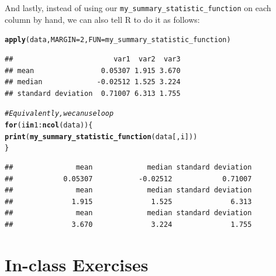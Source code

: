 \documentclass{article}\usepackage[]{graphicx}\usepackage[]{color}
\makeatletter
\newcommand{\hlnum}[1]{\textcolor[rgb]{0.686,0.059,0.569}{#1}}%
\newcommand{\hlcom}[1]{\textcolor[rgb]{0.678,0.584,0.686}{\textit{#1}}}%
\newcommand{\hlopt}[1]{\textcolor[rgb]{0,0,0}{#1}}%
\newcommand{\hlstd}[1]{\textcolor[rgb]{0.345,0.345,0.345}{#1}}%
\newcommand{\hlkwa}[1]{\textcolor[rgb]{0.161,0.373,0.58}{\textbf{#1}}}%
\newcommand{\hlkwc}[1]{\textcolor[rgb]{0.333,0.667,0.333}{#1}}%
\newcommand{\hlkwd}[1]{\textcolor[rgb]{0.737,0.353,0.396}{\textbf{#1}}}%
\newenvironment{kframe}{%
 \def\at@end@of@kframe{}%
 \ifinner\ifhmode%
  \def\at@end@of@kframe{\end{minipage}}%
  \begin{minipage}{\columnwidth}%
 \fi\fi%
 \def\FrameCommand##1{\hskip\@totalleftmargin \hskip-\fboxsep
 \colorbox{shadecolor}{##1}\hskip-\fboxsep
     \hskip-\linewidth \hskip-\@totalleftmargin \hskip\columnwidth}%
 \MakeFramed {\advance\hsize-\width
   \@totalleftmargin\z@ \linewidth\hsize
   \@setminipage}}%
 {\par\unskip\endMakeFramed%
 \at@end@of@kframe}
\newenvironment{knitrout}{}{} %
\makeatother
\begin{document}
And lastly, instead of using our \verb`my_summary_statistic_function` on each column by hand, we can also tell R to do it as follows:

\begin{knitrout}
\color{fgcolor}\begin{kframe}
\begin{alltt}
\hlkwd{apply}\hlstd{(data,} \hlkwc{MARGIN}\hlstd{=}\hlnum{2}\hlstd{,} \hlkwc{FUN}\hlstd{=my_summary_statistic_function)}
\end{alltt}
\begin{verbatim}
##                        var1  var2  var3
## mean                0.05307 1.915 3.670
## median             -0.02512 1.525 3.224
## standard deviation  0.71007 6.313 1.755
\end{verbatim}
\begin{alltt}
\hlcom{# Equivalently, we can use loop}
\hlkwa{for} \hlstd{(i} \hlkwa{in} \hlnum{1}\hlopt{:}\hlkwd{ncol}\hlstd{(data)) \{}
  \hlkwd{print}\hlstd{(}\hlkwd{my_summary_statistic_function}\hlstd{(data[ , i]))}
\hlstd{\}}
\end{alltt}
\begin{verbatim}
##               mean             median standard deviation 
##            0.05307           -0.02512            0.71007 
##               mean             median standard deviation 
##              1.915              1.525              6.313 
##               mean             median standard deviation 
##              3.670              3.224              1.755
\end{verbatim}
\end{kframe}
\end{knitrout}

\section{In-class Exercises}
\end{document}
